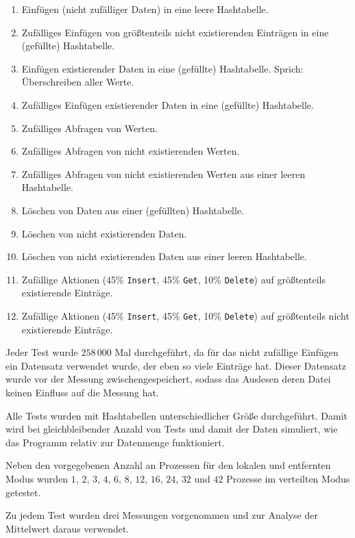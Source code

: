 \documentclass{scrreprt}
\begin{document}
\begin{enumerate}
\item Einfügen (nicht zufälliger Daten) in eine leere Hashtabelle.
\item Zufälliges Einfügen von größtenteils nicht existierenden Einträgen in eine (gefüllte) Hashtabelle.
\item Einfügen existierender Daten in eine (gefüllte) Hashtabelle. Sprich: Überschreiben aller Werte.
\item Zufälliges Einfügen existierender Daten in eine (gefüllte) Hashtabelle.
\item Zufälliges Abfragen von Werten.
\item Zufälliges Abfragen von nicht existierenden Werten.
\item Zufälliges Abfragen von nicht existierenden Werten aus einer leeren Hashtabelle.
\item Löschen von Daten aus einer (gefüllten) Hashtabelle.
\item Löschen von nicht existierenden Daten.
\item Löschen von nicht existierenden Daten aus einer leeren Hashtabelle.
\item Zufällige Aktionen (45\% \lstinline|Insert|, 45\% \lstinline|Get|, 10\% \lstinline|Delete|) auf größtenteils existierende Einträge.
\item Zufällige Aktionen (45\% \lstinline|Insert|, 45\% \lstinline|Get|, 10\% \lstinline|Delete|) auf größtenteils nicht existierende Einträge.
\end{enumerate}

Jeder Test wurde $258\,000$ Mal durchgeführt, da für das nicht zufällige Einfügen ein Datensatz verwendet wurde, der eben so viele Einträge hat. Dieser Datensatz wurde vor der Messung zwischengespeichert, sodass das Auslesen deren Datei keinen Einfluss auf die Messung hat.

Alle Tests wurden mit Hashtabellen unterschiedlicher Größe durchgeführt. Damit wird bei gleichbleibender Anzahl von Tests und damit der Daten simuliert, wie das Programm relativ zur Datenmenge funktioniert.

Neben den vorgegebenen Anzahl an Prozessen für den lokalen und entfernten Modus wurden $1$, $2$, $3$, $4$, $6$, $8$, $12$, $16$, $24$, $32$ und $42$ Prozesse im verteilten Modus getestet.

Zu jedem Test wurden drei Messungen vorgenommen und zur Analyse der Mittelwert daraus verwendet. 
\end{document}
